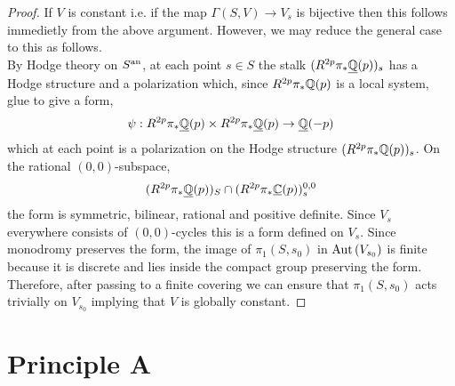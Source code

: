 \documentclass[12pt]{article}
\begin{document}
\begin{proof}
If $V$ is constant i.e. if the map $\Gamma(S, V) \to V_s$ is bijective then this follows immedietly from the above argument. However, we may reduce the general case to this as follows.
\bigskip\\
By Hodge theory on $S^{\mathrm{an}}$, at each point $s \in S$ the stalk $(R^{2 p} \pi_* \underline{\mathbb{Q}}(p))_s$ has a Hodge structure and a polarization which, since $R^{2 p} \pi_* \mathbb{Q}(p)$ is a local system, glue to give a form,
\[ \psi : R^{2 p} \pi_* \underline{\mathbb{Q}}(p) \times R^{2 p} \pi_* \underline{\mathbb{Q}}(p) \to \underline{\mathbb{Q}}(-p) \]
which at each point is a polarization on the Hodge structure $(R^{2 p} \pi_* \mathbb{Q}(p))_s$. On the rational $(0,0)$-subspace,
\[ (R^{2 p} \pi_* \underline{\mathbb{Q}}(p))_S \cap (R^{2 p} \pi_* \underline{\mathbb{C}}(p))_s^{0,0} \]
the form is symmetric, bilinear, rational and positive definite. Since $V_{s}$ everywhere consists of $(0,0)$-cycles this is a form defined on $V_{s}$. Since monodromy preserves the form, the image of $\pi_1(S, s_0)$ in $\mathrm{Aut} \left( V_{s_0} \right)$ is finite because it is discrete and lies inside the compact group preserving the form. Therefore, after passing to a finite covering we can ensure that $\pi_1(S, s_0)$ acts trivially on $V_{s_0}$ implying that $V$ is globally constant. 
\end{proof}


\section{Principle A}
\end{document}
